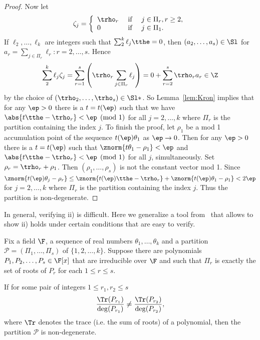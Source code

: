 \begin{proof}
Now let 
\[ \zeta_j = \left\{ 
\begin{array}{lll}
\trho_r & \mbox{ if } & j \in \Pi_r, r\geq 2,\\
0 & \mbox{ if } & j \in \Pi_1.
\end{array}
\right.
\]
If $\ell_2, \dots, \ell_k$ are integers such that $\sum_2^k \ell_j \tthe = 0$, then $(a_2,\dots,a_s) \in \Sl$ for $a_r = \sum_{j \in \Pi_r} \ell_r : r=2,\dots, s$. Hence  
\[ \sum_2^k \ell_j \zeta_j = \sum_{r=1}^s \left( \trho_r \sum_{j \in \Pi_r} \ell_j \right) = 0 + \sum_{r=2}^s \trho_r a_r  \in \Z\] by the choice of $(\trho_2,\dots, \trho_s) \in \Sl*$. So Lemma~\ref{lem:Kron} implies that for any $\ep > 0$ there is a $t = t(\ep)$ such that we have $\abs{t \tthe - \trho_r} < \ep \pmod{1} $ for all $j = 2,\dots,k$ where $\Pi_r$ is the partition containing the index $j$. To finish the proof, let $\rho_1$ be a mod 1 accumulation point of the sequence $t(\ep) \theta_1$ as $\ep \to 0$. Then for any $\ep >0 $ there is a $t = t(\ep)$ such that $\znorm{t \theta_1 -\rho_1} < \ep$ and $\abs{t \tthe - \trho_r} < \ep \pmod{1} $ for all $j$, simultaneously. Set $\rho_r = \trho_r + \rho_1$. Then $(\rho_1, \dots, \rho_s)$ is not the constant vector mod 1. Since $\znorm{t(\ep) \theta_j - \rho_r } \leq \znorm{t(\ep) \tthe - \trho_r} + \znorm{t(\ep) \theta_1 - \rho_1} < 2\ep$ for $j = 2,\dots,k$ where $\Pi_r$ is the partition containing the index $j$. Thus the partition is non-degenerate.
\end{proof}

In general, verifying ii) is difficult. Here we generalize a tool from~\cite{eisenberg2019pretty} that allows to show ii) holds under certain conditions that are easy to verify.

\begin{theorem}\label{thm:tr/deg}

Fix a field $\F$, a sequence of real numbers $\theta_1, \dots, \theta_k$ and a partition $\mathcal{P} = (\Pi_1,\dots,\Pi_s)$ of $\{1,2,\dots, k\}$. Suppose there are polynomials $P_1,P_2,\dots, P_s  \in \F[x]$ that are irreducible over $\F$ and such that $\Pi_r$ is exactly the set of roots of $P_r$ for each $1\leq r \leq s$. 

If for some pair of integers $1 \leq r_1, r_2 \leq s$
\[
\frac{\Tr(P_{r_1})}{\deg(P_{r_1})}\neq\frac{\Tr(P_{r_2})}{\deg(P_{r_2})},
\]
where $\Tr$ denotes the trace (i.e. the sum of roots) of a polynomial, then the partition $\mathcal{P}$ is non-degenerate. 
\end{theorem}


